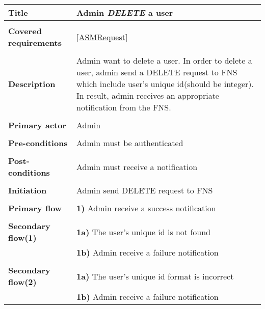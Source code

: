 \documentclass[a4paper,11pt]{article}
\begin{document}
\begin{tabular}{|p{3.5cm}|p{11.5cm}|} \hline
    \textbf{Title} &   Admin \emph{DELETE} a user
        
    \\ \hline \rowcolor{Gray} & \\ \hline
    
    \textbf{Covered requirements} &  \ref{ASMRequest}
        
    \\ \hline \rowcolor{Gray} & \\ \hline
        
    \textbf{Description} &  Admin want to delete a user. In order to delete a user, admin send a DELETE request to FNS which include user's unique id(should be integer). In result, admin receives an appropriate notification from the FNS.
        
    \\ \hline \rowcolor{Gray} & \\ \hline
        
    \textbf{Primary actor} & Admin  
        
    \\ \hline \rowcolor{Gray} & \\ \hline 
          
    \textbf{Pre-conditions} &   Admin must be authenticated
        
    \\ \hline \rowcolor{Gray} & \\ \hline
         
    \textbf{Post-conditions} &   Admin must receive a notification
        
    \\ \hline \rowcolor{Gray} & \\ \hline 
         
    \textbf{Initiation} & Admin send DELETE request to FNS
        
    \\ \hline \rowcolor{Gray} & \\ \hline 
         
    \textbf{Primary flow} & 
    \textbf{1)} Admin receive a success notification
        
    \\ \hline \rowcolor{Gray} & \\ \hline 
         
    \textbf{Secondary flow(1)} & 
    \textbf{1a)} The user's unique id is not found \\&
    \textbf{1b)} Admin receive a failure notification
     
    \\ \hline \rowcolor{Gray} & \\ \hline 
     
    \textbf{Secondary flow(2)} & 
    \textbf{1a)} The user's unique id format is incorrect \\&
    \textbf{1b)} Admin receive a failure notification
    \\ \hline 
\end{tabular}
\end{document}
